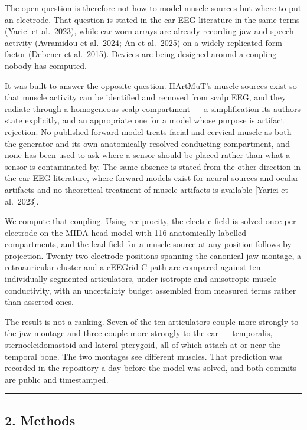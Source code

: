 \documentclass[
  11pt,
]{article}
\newcounter{none} %
\begin{document}
The open question is therefore not how to model muscle sources but where to
put an electrode. That question is stated in the ear-EEG literature in the
same terms (Yarici et al.~2023), while ear-worn arrays are already recording
jaw and speech activity (Avramidou et al.~2024; An et al.~2025) on a widely
replicated form factor (Debener et al.~2015). Devices are being designed
around a coupling nobody has computed.

It was built to answer the opposite question. HArtMuT's muscle sources exist so
that muscle activity can be identified and removed from scalp EEG, and they
radiate through a homogeneous scalp compartment --- a simplification its authors
state explicitly, and an appropriate one for a model whose purpose is artifact
rejection. No published forward model treats facial and cervical muscle as both
the generator and its own anatomically resolved conducting compartment, and none
has been used to ask where a sensor should be placed rather than what a sensor
is contaminated by. The same absence is stated from the other direction in the
ear-EEG literature, where forward models exist for neural sources and ocular
artifacts and no theoretical treatment of muscle artifacts is available {[}Yarici
et al.~2023{]}.

We compute that coupling. Using reciprocity, the electric field is solved once
per electrode on the MIDA head model with 116 anatomically labelled
compartments, and the lead field for a muscle source at any position follows by
projection. Twenty-two electrode positions spanning the canonical jaw montage, a
retroauricular cluster and a cEEGrid C-path are compared against ten
individually segmented articulators, under isotropic and anisotropic muscle
conductivity, with an uncertainty budget assembled from measured terms rather
than asserted ones.

The result is not a ranking. Seven of the ten articulators couple more strongly
to the jaw montage and three couple more strongly to the ear --- temporalis,
sternocleidomastoid and lateral pterygoid, all of which attach at or near the
temporal bone. The two montages see different muscles. That prediction was
recorded in the repository a day before the model was solved, and both commits
are public and timestamped.

\begin{center}\rule{0.5\linewidth}{0.5pt}\end{center}

\subsection{2. Methods}\label{methods}
\end{document}
